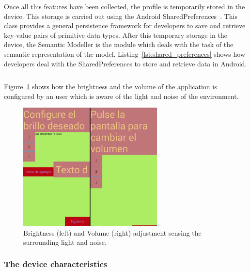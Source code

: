 Once all this features have been collected, the profile is temporarily stored in 
the device. This storage is carried out using the Android 
SharedPreferences~\citep{shared_preferences}. This class provides a general 
persistence framework for developers to save and retrieve key-value pairs of 
primitive data types. After this temporary storage in the device, the Semantic 
Modeller is the module which deals with the task of the semantic representation 
of the model. Listing~\ref{lst:shared_preferences} shows how developers deal 
with the SharedPreferences to store and retrieve data in Android.

\inputminted[linenos=true, fontsize=\footnotesize, frame=lines]{java}{4_system_architecture/shared_preferences.java}

Figure~\ref{fig:context_activity} shows how the brightness and the volume of
the application is configured by an user which is aware of the light and noise
of the environment.

\begin{figure}
\centering
\includegraphics[width=0.65\textwidth]{context_activity.png}
\caption{Brightness (left) and Volume (right) adjustment sensing the surrounding
light and noise.}
\label{fig:context_activity}
\end{figure}


\subsubsection{The device characteristics}
\label{sec:device_characteristics}

